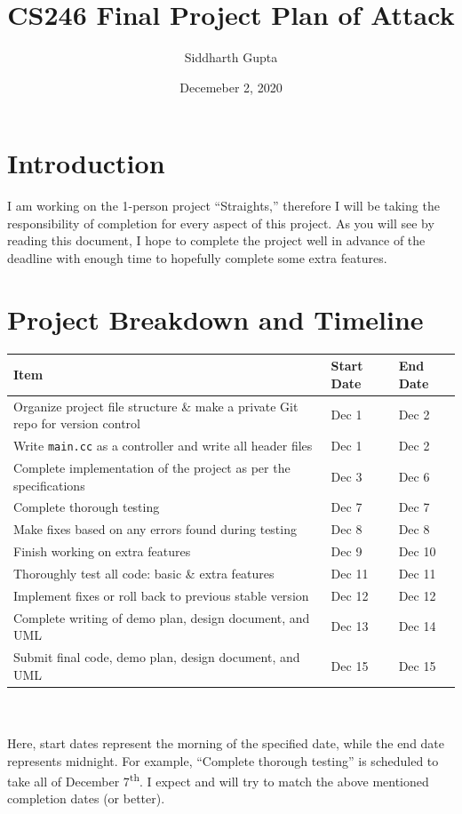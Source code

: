 \documentclass[10pt]{article}
\title{CS246 Final Project Plan of Attack}
\author{Siddharth Gupta}
\date{Decemeber 2, 2020}
\begin{document}
	\maketitle
	\section{Introduction}
		I am working on the 1-person project ``Straights,'' therefore I will be taking the responsibility of completion for every aspect of this project. As you will see by reading this document, I hope to complete the project well in advance of the deadline with enough time to hopefully complete some extra features.

	\section{Project Breakdown and Timeline}
		\begin{tabular}{|l|l|l|}
				\hline
				\textbf{Item}&\textbf{Start Date}&\textbf{End Date}\\\hline\hline
				Organize project file structure \& make a private Git repo for version control& Dec 1 & Dec 2\\\hline
				Write {\tt main.cc} as a controller and write all header files & Dec 1 & Dec 2\\\hline
				Complete implementation of the project as per the specifications & Dec 3 & Dec 6\\\hline
				Complete thorough testing & Dec 7 & Dec 7\\\hline
				Make fixes based on any errors found during testing & Dec 8 & Dec 8\\\hline
				Finish working on extra features & Dec 9 & Dec 10\\\hline
				Thoroughly test all code: basic \& extra features & Dec 11 & Dec 11\\\hline
				Implement fixes or roll back to previous stable version & Dec 12 & Dec 12\\\hline
				Complete writing of demo plan, design document, and UML & Dec 13 & Dec 14\\\hline
				Submit final code, demo plan, design document, and UML & Dec 15 & Dec 15\\\hline
		\end{tabular}\\\\
		Here, start dates represent the morning of the specified date, while the end date represents midnight. For example, ``Complete thorough testing'' is scheduled to take all of December 7\textsuperscript{th}.
		I expect and will try to match the above mentioned completion dates (or better).
\end{document}
